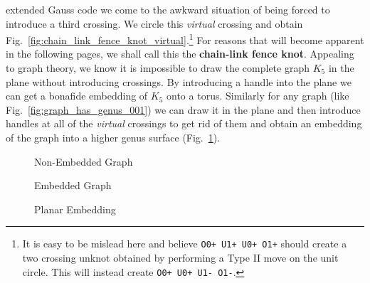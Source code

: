 \documentclass{article}
\theoremstyle{plain}
\begin{document}
        extended Gauss code we come to the awkward situation of being forced
        to introduce a third crossing. We circle this \textit{virtual} crossing
        and obtain Fig.~\ref{fig:chain_link_fence_knot_virtual}.\footnote{%
            It is easy to be mislead here and believe
            \texttt{O0+ U1+ U0+ O1+} should create a two crossing unknot
            obtained by performing a Type II move on the unit circle. This will
            instead create \texttt{O0+ U0+ U1- O1-}.
        }
        For reasons that will become apparent in the following pages, we shall
        call this the \textbf{chain-link fence knot}. Appealing to graph
        theory, we know it is impossible to draw the complete graph
        $K_{5}$ in the plane without introducing crossings. By introducing a
        handle into the plane we can get a bonafide embedding of
        $K_{5}$ onto a torus. Similarly for any graph (like
        Fig.~\ref{fig:graph_has_genus_001}) we can draw it in the
        plane and then introduce handles at all of the \textit{virtual}
        crossings to get rid of them and obtain an embedding of the graph
        into a higher genus surface (Fig.~\ref{fig:graph_has_genus_002}).
        \begin{figure}
            \centering
            \begin{minipage}[b]{0.49\textwidth}
                \centering
                \caption{Non-Embedded Graph}
                \label{fig:graph_has_genus_001}
            \end{minipage}
            \hfill
            \begin{minipage}[b]{0.49\textwidth}
                \centering
                \caption{Embedded Graph}
                \label{fig:graph_has_genus_002}
            \end{minipage}
        \end{figure}
        \begin{figure}
            \centering
            \caption{Planar Embedding}
            \label{fig:graph_has_genus_003}
        \end{figure}
        \par\hfill\par
\end{document}
